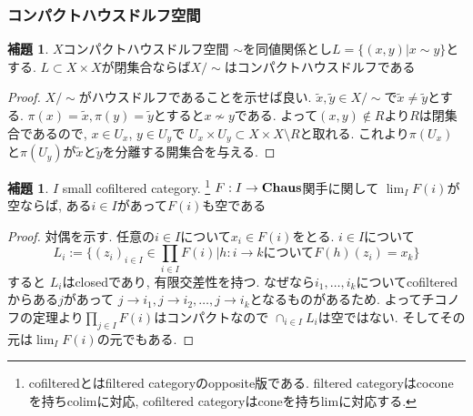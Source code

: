 \documentclass[dvipdfmx,a4paper,11pt]{article}
\theoremstyle{definition}
\newtheorem{lem}[thm]{補題}
\begin{document}
\subsubsection{コンパクトハウスドルフ空間}

 \begin{tcolorbox}
 [colback = white, colframe = green!35!black, fonttitle = \bfseries,breakable = true]
\begin{lem}
\label{lem-CHaus-relation}
$X$コンパクトハウスドルフ空間
$\sim$を同値関係とし$L = \{ (x,y) | x \sim y\}$とする.
$L \subset X \times X$が閉集合ならば$X/\sim$はコンパクトハウスドルフである
\end{lem}
\end{tcolorbox}

\begin{proof}
$X / \sim$がハウスドルフであることを示せば良い.
$\tilde{x}, \tilde{y} \in X/ \sim$で$\tilde{x} \neq \tilde{y}$とする.
$\pi(x) = \tilde{x}, \pi(y) = \tilde{y}$とすると$x \not \sim y$である.
よって$(x,y) \not \in R$より$R$は閉集合であるので, $x \in U_x$, $y \in U_y$で
$U_x \times U_y \subset X \times X \setminus R$と取れる.
これより$\pi(U_x)$と$\pi(U_y)$が$\tilde{x}$と$\tilde{y}$を分離する開集合を与える. 
\end{proof}


   \begin{tcolorbox}
 [colback = white, colframe = green!35!black, fonttitle = \bfseries,breakable = true]
\begin{lem}
\label{lem-cpthaus}
$I$ small cofiltered category. \footnote{cofilteredとはfiltered categoryのopposite版である. filtered categoryはcoconeを持ちcolimに対応, cofiltered categoryはconeを持ちlimに対応する.}
$F :  I \to {\bf Chaus}$関手に関して
$\lim_{I}F(i)$が空ならば, ある$i \in I$があって$F(i)$も空である
\end{lem}
\end{tcolorbox}
\begin{proof}
対偶を示す. 
任意の$i \in I$について$x_i \in F(i)$をとる. 
$i \in I$について
$$
L_i := \{(z_i)_{i \in I} \in \prod_{i \in I}F(i) | \text{$h : i \to k$について$F(h)(z_i) = x_k$}\}
$$
すると
$L_i$はclosedであり, 有限交差性を持つ.
なぜなら$i_1, \ldots, i_k$についてcofilteredからある$j$があって
$j \to i_1, j\to i_2, \ldots , j\to i_k$となるものがあるため. 
よってチコノフの定理より$\prod_{j \in I}F(i) $はコンパクトなので
$\cap_{i \in I} L_i$は空ではない.
そしてその元は$\lim_{I}F(i)$の元でもある.
\end{proof}
\end{document}
